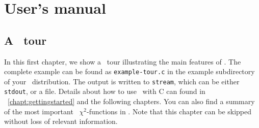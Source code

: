 
\part{User's manual}
\label{part:1}

\chapter{A \GLOBES\ tour}
\label{chapter:tour}

In this first chapter, we show a \GLOBES\ tour illustrating the
main features of \GLOBES . The complete example  
can be found as {\tt example-tour.c} in the example subdirectory of your \GLOBES\ distribution.
The output is written to {\tt stream}, which can be either {\tt stdout},
or a file. Details about how to use \GLOBES\ with C can found in \Chapt~\ref{chapt:gettingstarted} and the following chapters.
You can also find a summary of the most important \GLOBES\ $\chi^2$-functions in . Note that this chapter
can be skipped without loss of relevant information.

